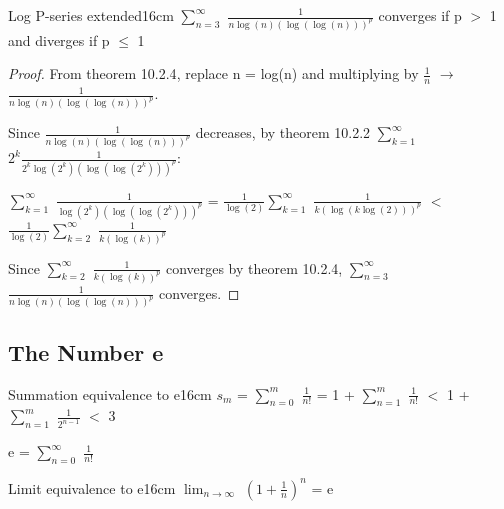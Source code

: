     \vspace{0.5cm}



    \begin{corollary}{Log P-series extended}{16cm}
        $\sum_{n=3}^{\infty}$ $\frac{1}{n\log(n)(\log(\log(n)))^p}$
        converges if p $>$ 1 and diverges if p $\leq$ 1
    \end{corollary}
    
    \begin{proof}
        From {\color{red} theorem 10.2.4}, replace n = log(n) and
        multiplying by $\frac{1}{n}$ $\rightarrow$
        $\frac{1}{n\log(n)(\log(\log(n)))^p}$.

        Since $\frac{1}{n\log(n)(\log(\log(n)))^p}$ decreases,
        by {\color{red} theorem 10.2.2}
        $\sum_{k=1}^{\infty}$ $2^k \frac{1}{2^k \log(2^k)(\log(\log(2^k)))^p}$:
        
        \hspace{1cm}
        $\sum_{k=1}^{\infty}$ $\frac{1}{\log(2^k)(\log(\log(2^k)))^p}$
        = $\frac{1}{\log(2)} \sum_{k=1}^{\infty}$ $\frac{1}{k (\log(k \log(2)))^p}$
        $<$ $\frac{1}{\log(2)} \sum_{k=2}^{\infty}$ $\frac{1}{k (\log(k))^p}$

        Since $\sum_{k=2}^{\infty}$ $\frac{1}{k (\log(k))^p}$ converges
        by {\color{red} theorem 10.2.4},
        $\sum_{n=3}^{\infty}$ $\frac{1}{n\log(n)(\log(\log(n)))^p}$ converges.
    \end{proof}

    \vspace{0.5cm}





\subsection{ The Number e}

    \begin{definition}{Summation equivalence to e}{16cm}
        $s_m$
        = $\sum_{n=0}^{m}$ $\frac{1}{n!}$
        = 1 + $\sum_{n=1}^{m}$ $\frac{1}{n!}$
        $<$ 1 + $\sum_{n=1}^{m}$ $\frac{1}{2^{n-1}}$
        $<$ 3

        e = $\sum_{n=0}^{\infty}$ $\frac{1}{n!}$
    \end{definition}

    \vspace{0.5cm}



    \begin{wtheorem}{Limit equivalence to e}{16cm}
        $\lim_{n \rightarrow \infty}$ $(1 + \frac{1}{n})^n$ = e
    \end{wtheorem}

